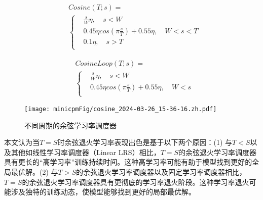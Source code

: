 \begin{figure}[htbp]
    \centering
    \begin{minipage}{0.47\linewidth}
        \begin{equation*}
    \begin{aligned}
    & Cosine(T; s) = \\
    & \begin{cases}
       & \frac{s}{W} \eta, \quad s<W \\
       & 0.45\eta cos(\pi \frac{s}{T}) + 0.55\eta, \quad W < s < T \\
       & 0.1\eta,\quad  s > T \\
    \end{cases}
\end{aligned}
        \end{equation*}
    \end{minipage}
    \hfill %
    \begin{minipage}{0.52\linewidth}
             \begin{equation*}
    \begin{aligned}
    & CosineLoop(T; s) = \\
    & \begin{cases}
       & \frac{s}{W} \eta, \quad s<W \\
       & 0.45\eta cos(\pi \frac{s}{T}) + 0.55\eta, \quad W < s  \\
    \end{cases}
\end{aligned}
        \end{equation*}
    \end{minipage}
\end{figure}

\begin{figure}
    \centering
    \texttt{[image: minicpmFig/cosine\_2024-03-26\_15-36-16.zh.pdf]}
    \caption{不同周期的余弦学习率调度器}
    \label{fig:cosine_lr}
    \vspace{0.47cm}
\end{figure}

本文认为当$T = S$时余弦退火学习率表现出色是基于以下两个原因：(1) 与$T < S$以及其他如线性学习率调度器（Linear LRS）相比，$T = S$的余弦退火学习率调度器具有更长的“高学习率”训练持续时间。这种高学习率可能有助于模型找到更好的全局最优解。(2) 与$T > S$的余弦退火学习率调度器以及固定学习率调度器相比，$T = S$的余弦退火学习率调度器具有更彻底的学习率退火阶段。这种学习率退火可能涉及独特的训练动态，使模型能够找到更好的局部最优解。

